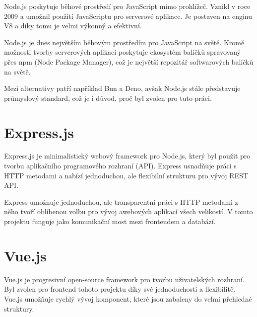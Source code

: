 Node.js poskytuje běhové prostředí pro JavaScript mimo prohlížeč. Vznikl v roce 2009 a umožnil použití JavaScriptu pro serverové aplikace. Je postaven na enginu V8 a díky tomu je velmi výkonný a efektivní.\cite{enwiki:1262522147}

Node.js je dnes největším běhovým prostředím pro JavaScript na světě. Kromě možnosti tvorby serverových aplikací poskytuje ekosystém balíčků spravovaný přes npm (Node Package Manager), což je největší repozitář softwarových balíčků na světě.\cite{enwiki:1262522147}

Mezi alternativy patří například Bun a Deno, avšak Node.js stále představuje průmyslový standard, což je i důvod, proč byl zvolen pro tuto práci.

\section{Express.js}
Express.js je minimalistický webový framework pro Node.js, který byl použit pro tvorbu aplikačního programového rozhraní (API). Express usnadňuje práci s HTTP metodami a nabízí jednoduchou, ale flexibilní strukturu pro vývoj REST API\cite{enwiki:1258184667}.

Express umožnuje jednoduchou, ale transparentní práci s HTTP metodami z něho tvoří oblíbenou volbu pro vývoj awebových aplikací všech velikostí. V tomto projektu funguje jako komunikační most mezi frontendem a databází.

\section{Vue.js}
Vue.js je progresivní open-source framework pro tvorbu uživatelských rozhraní. Byl zvolen pro frontend tohoto projektu díky své jednoduchosti a flexibilitě. Vue.js 
umožňuje rychlý vývoj komponent, které jsou zabaleny do velmi přehledné struktury.

